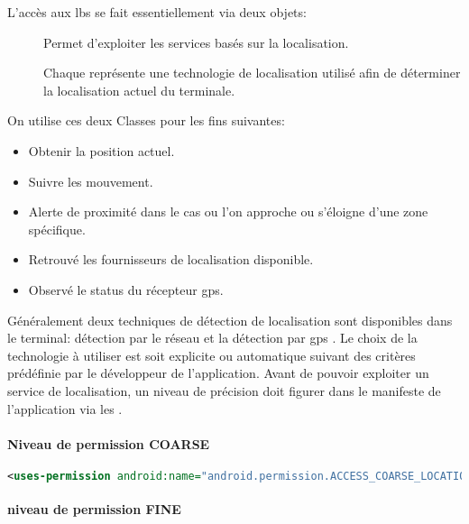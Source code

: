 L'accès aux \gls{lbs} se fait essentiellement via deux objets:
\begin{description}
\item [] Permet d'exploiter les services basés sur la localisation.
\item [] Chaque  représente une technologie de localisation utilisé afin de déterminer la localisation actuel du terminale.

\end{description}
On utilise ces deux Classes pour les fins suivantes:
\begin{itemize}
\item Obtenir la position actuel.
\item Suivre les mouvement.
\item Alerte de proximité dans le cas ou l'on approche ou s’éloigne d'une zone spécifique.
\item Retrouvé les fournisseurs de localisation disponible.
\item Observé le status du récepteur \gls{gps}.
\end{itemize}

Généralement deux techniques de détection de localisation sont disponibles dans le terminal: détection par le réseau  et la détection par \gls{gps} . Le choix de la technologie à utiliser est soit explicite ou automatique suivant des critères prédéfinie par le développeur de l'application. Avant de pouvoir exploiter un service de localisation, un niveau de précision doit figurer dans le manifeste de l'application via les  .

\paragraph{Niveau de permission \textbf{COARSE} } %
\label{par:coarse}

\begin{lstlisting}[language=xml, caption=permission pour la localisation par le réseau.]
<uses-permission android:name="android.permission.ACCESS_COARSE_LOCATION"/>
\end{lstlisting}

\paragraph{niveau de permission \textbf{FINE} } %
\label{par:fine}

